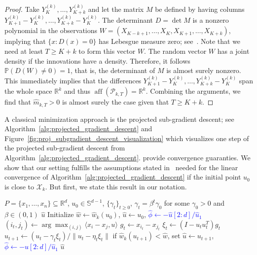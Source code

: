 \begin{proof}
    Take $Y_K^{(k)},\dots,Y_{K+k}^{(k)}$ and let the matrix $M$ be defined by having columns $Y_{K+1}^{(k)}-Y_K^{(k)},\dots,Y_{K+k}^{(k)}-Y_{K}^{(k)}$. The determinant $D=\det{M}$ is a nonzero polynomial in the observations $W=(X_{K-k+1},\dots,X_K,X_{K+1},\dots,X_{K+k})$, implying that $\{x:D(x)=0\}$ has Lebesgue measure zero; see~\cite{caron_zero_nodate}. Note that we need at least $T\ge K+k$ to form this vector $W$. The random vector $W$ has a joint density if the innovations have a density. Therefore, it follows $\mathbb{P}(D(W)\ne0)=1$, that is, the determinant of $M$ is almost surely nonzero. This immediately implies that the differences $Y_{K+1}^{(k)}-Y_K^{(k)},\dots,Y_{K+k}^{(k)}-Y_{K}^{(k)}$ span the whole space $\mathbb{R}^{k}$ and thus $\operatorname{aff}(\mathcal{P}_{k,T})=\mathbb{R}^{k}$. Combining the arguments, we find that $\hat{m}_{k,T}>0$ is almost surely the case given that $T\ge K+k$.
\end{proof}

A classical minimization approach is the projected sub-gradient descent; see Algorithm~\ref{alg:projected_gradient_descent} and Figure~\ref{fig:proj_subgradient_descent_visualization} which visualizes one step of the projected sub-gradient descent from Algorithm~\ref{alg:projected_gradient_descent}. \cite{li2021weaklyconvexoptimizationstiefel} provide convergence guaranties. We show that our setting fulfills the assumptions stated in~\cite[Theorem 4]{li2021weaklyconvexoptimizationstiefel} needed for the linear convergence of Algorithm~\ref{alg:projected_gradient_descent} if the initial point $u_0$ is close to $\mathcal{X}_k$. But first, we state this result in our notation.

\begin{algorithm}[ht]
    \caption{Projected gradient descent}
    \label{alg:projected_gradient_descent}
    \begin{algorithmic}[1]
        \Require $P=\{x_1,\dots,x_n\}\subseteq\mathbb{R}^{d}$, $u_0\in\mathbb{S}^{d-1}$, $\{\gamma_t\}_{t\ge 0}$, $\gamma_t=\beta^{t}\gamma_0$ for some $\gamma_0>0$ and $\beta\in(0,1)$
        \Ensure $\hat{u}$
        \State Initialize $\hat{w}\gets\hat{w}_k(u_0)$, $\hat{u}\gets u_0$, \textcolor{blue}{$\hat{\phi}\gets-\hat{u}[2:d]/\hat{u}_1$}
            \State $(i_t,j_t)\gets\arg\max_{(i,j)}\langle x_i-x_j,u\rangle$
            \State $g_t\gets x_{i_t}-x_{j_t}$
            \State $\xi_t\gets(I-u_tu_t^{T})g_t$
            \State $u_{t+1}\gets (u_t-\gamma_t\xi_t)/\|u_t-\eta_t\xi_t\|$
            \State if $\hat{w}_k(u_{t+1})<\hat{w}$, set $\hat{u}\gets u_{t+1}$, \textcolor{blue}{$\hat{\phi}\gets-\hat{u}[2:d]/\hat{u}_1$}
        \EndFor
        \State\Return $\hat{u}$
    \end{algorithmic}
\end{algorithm}

